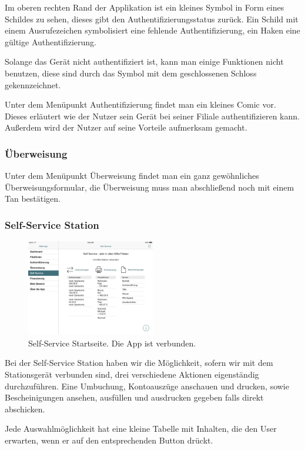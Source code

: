 	Im oberen rechten Rand der Applikation ist ein kleines Symbol in Form eines Schildes zu sehen, dieses gibt den Authentifizierungsstatus zurück. Ein Schild mit einem Ausrufezeichen symbolisiert eine fehlende Authentifizierung, ein Haken eine gültige Authentifizierung.

	Solange das Gerät nicht authentifiziert ist, kann man einige Funktionen nicht benutzen, diese sind durch das Symbol mit dem geschlossenen Schloss gekennzeichnet.

	Unter dem Menüpunkt Authentifizierung findet man ein kleines Comic vor. Dieses erläutert wie der Nutzer sein Gerät bei seiner Filiale authentifizieren kann. Außerdem wird der Nutzer auf seine Vorteile aufmerksam gemacht.

\subsubsection{Überweisung}
	Unter dem Menüpunkt Überweisung findet man ein ganz gewöhnliches Überweisungsformular, die Überweisung muss man abschließend noch mit einem Tan bestätigen.

\subsubsection{Self-Service Station}
\begin{figure}[h]
	\centering
  \includegraphics[width=0.5\textwidth]{Pictures/SSverbunden}
	\caption{Self-Service Startseite. Die App ist verbunden.}
	\label{fig5}
\end{figure}

	Bei der Self-Service Station haben wir die Möglichkeit, sofern wir mit dem Stationsgerät verbunden sind, drei verschiedene Aktionen eigenständig durchzuführen. Eine Umbuchung, Kontoauszüge anschauen und drucken, sowie Bescheinigungen ansehen, ausfüllen und ausdrucken gegeben falls direkt abschicken.

	Jede Auswahlmöglichkeit hat eine kleine Tabelle mit Inhalten, die den User erwarten, wenn er auf den entsprechenden Button drückt.

